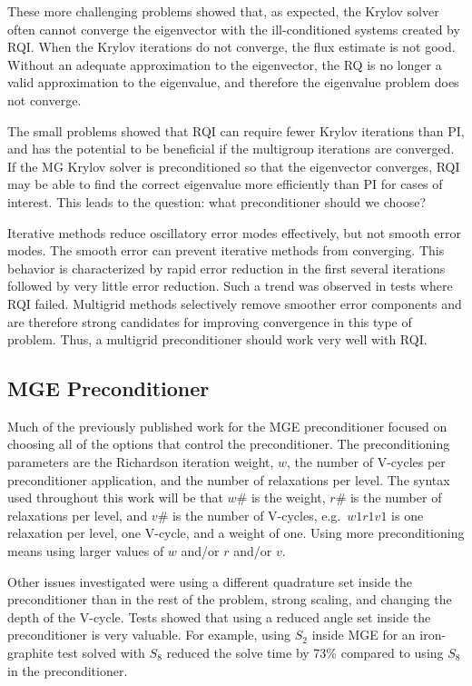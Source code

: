 \documentclass{article}                                                                           %
\begin{document}
These more challenging problems showed that, as expected, the Krylov solver often cannot converge the eigenvector with the ill-conditioned systems created by RQI. When the Krylov iterations do not converge, the flux estimate is not good. Without an adequate approximation to the eigenvector, the RQ is no longer a valid approximation to the eigenvalue, and therefore the eigenvalue problem does not converge. 

The small problems showed that RQI can require fewer Krylov iterations than PI, and has the potential to be beneficial if the multigroup iterations are converged. If the MG Krylov solver is preconditioned so that the eigenvector converges, RQI may be able to find the correct eigenvalue more efficiently than PI for cases of interest. This leads to the question: what preconditioner should we choose?

Iterative methods reduce oscillatory error modes effectively, but not smooth error modes. The smooth error can prevent iterative methods from converging. This behavior is characterized by rapid error reduction in the first several iterations followed by very little error reduction. Such a trend was observed in tests where RQI failed. Multigrid methods selectively remove smoother error components and are therefore strong candidates for improving convergence in this type of problem. Thus, a multigrid preconditioner should work very well with RQI. 

\subsection{MGE Preconditioner}
Much of the previously published work for the MGE preconditioner focused on choosing all of the options that control the preconditioner. The preconditioning parameters are the Richardson iteration weight, $w$, the number of V-cycles per preconditioner application, and the number of relaxations per level. The syntax used throughout this work will be that $w\#$ is the weight, $r\#$ is the number of relaxations per level, and $v\#$ is the number of V-cycles, e.g.\ $w1r1v1$ is one relaxation per level, one V-cycle, and a weight of one. Using more preconditioning means using larger values of $w$ and/or $r$ and/or $v$. 

Other issues investigated were using a different quadrature set inside the preconditioner than in the rest of the problem, strong scaling, and changing the depth of the V-cycle. 
Tests showed that using a reduced angle set inside the preconditioner is very valuable. For example, using $S_2$ inside MGE for an iron-graphite test solved with $S_8$ reduced the solve time by 73\% compared to using $S_8$ in the preconditioner.
\end{document}
